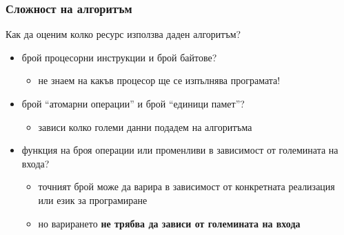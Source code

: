 \documentclass{beamer}
\begin{document}
\begin{frame}
  \frametitle{Сложност на алгоритъм}

  Как да оценим колко ресурс използва даден алгоритъм?
  \pause
  \vspace{1em}

  \begin{itemize}[<+->]
  \item брой процесорни инструкции и брой байтове?
    \begin{itemize}
    \item не знаем на какъв процесор ще се изпълнява програмата!
    \end{itemize}
  \item брой ``атомарни операции'' и брой ``единици памет''?
    \begin{itemize}
    \item зависи колко големи данни подадем на алгоритъма
    \end{itemize}
  \item функция на броя операции или променливи в зависимост от големината на входа?
    \begin{itemize}
    \item точният брой може да варира в зависимост от конкретната реализация или език за програмиране
    \item но варирането \textbf{не трябва да зависи от големината на входа}
    \end{itemize}
  \end{itemize}
  \vspace{1em}

\end{frame}
\end{document}
